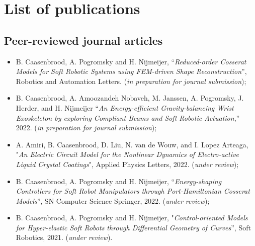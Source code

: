 \chapter*{List of publications}
\newcommand{\ipj}{(\textit{in preparation for journal submission})}
\newcommand{\cur}{(\textit{under review})}

\section*{Peer-reviewed journal articles}
\begin{itemize}[leftmargin=4mm]
\item B. Caasenbrood, A. Pogromsky and H. Nijmeijer, “\textit{Reduced-order Cosserat Models for Soft Robotic
 Systems using FEM-driven Shape Reconstruction}”, Robotics and Automation Letters. \ipj;
\item B. Caasenbrood, A. Amoozandeh Nobaveh, M. Janssen, A. Pogromsky, J. Herder, and H. Nijmeijer “\textit{An Energy-efficient Gravity-balancing Wrist Exoskeleton by exploring Compliant Beams and Soft Robotic Actuation},”  2022. \ipj;
\item A. Amiri, B. Caasenbrood, D. Liu, N. van de Wouw, and I. Lopez Arteaga, "\textit{An Electric Circuit Model for the Nonlinear Dynamics of Electro-active Liquid Crystal Coatings}", Applied Physics Letters, 2022. \cur;
\item  B. Caasenbrood, A. Pogromsky and H. Nijmeijer, “\textit{Energy-shaping Controllers for Soft Robot Manipulators through Port-Hamiltonian Cosserat Models}”, SN Computer Science Springer, 2022. \cur;
\item B. Caasenbrood, A. Pogromsky and H. Nijmeijer, "\textit{Control-oriented Models for Hyper-elastic Soft Robots through Differential Geometry of Curves}”, Soft Robotics, 2021. \cur.
\end{itemize}



